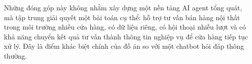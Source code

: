\documentclass[../DoAn.tex]{subfiles}
\begin{document}
Những đóng góp này không nhằm xây dựng một nền tảng AI agent tổng quát, mà tập trung giải quyết một bài toán cụ thể: hỗ trợ tư vấn bán hàng nội thất trong môi trường nhiều cửa hàng, có dữ liệu riêng, có hội thoại nhiều lượt và có khả năng chuyển kết quả tư vấn thành thông tin nghiệp vụ để cửa hàng tiếp tục xử lý. Đây là điểm khác biệt chính của đồ án so với một chatbot hỏi đáp thông thường.
\end{document}

